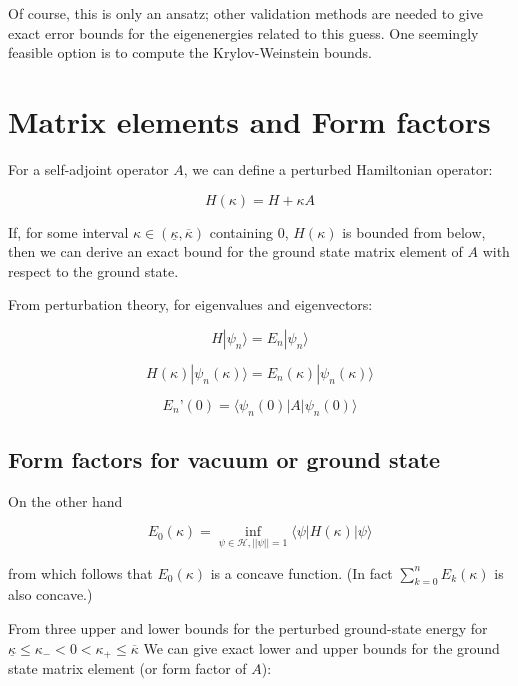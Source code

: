 \documentclass{article}
\theoremstyle{definition}
\begin{document}
Of course, this is only an ansatz; other validation methods are needed to give exact error bounds for the eigenenergies related to this guess. One seemingly feasible option is to compute the Krylov-Weinstein bounds.


\section{Matrix elements and Form factors}

For a self-adjoint operator $ A$, we can define a perturbed Hamiltonian operator:

\begin{equation}
H(\kappa) = H+\kappa A
\end{equation}

If, for some interval $\kappa \in (\underline{\kappa}, \overline{\kappa})$ containing $0$, $H(\kappa)$ is bounded from below, then we can derive an exact bound for the ground state matrix element of $A$ with respect to the ground state.

From perturbation theory, for eigenvalues and eigenvectors:

\begin{equation}
H |\psi_n\rangle = E_n |\psi_n\rangle
\end{equation}

\begin{equation}
H(\kappa) | \psi_n(\kappa) \rangle = E_n(\kappa) | \psi_n(\kappa) \rangle
\end{equation}

\begin{equation}
E_n’(0) = \langle \psi_n(0) | A | \psi_n(0) \rangle
\end{equation}

\subsection{Form factors for vacuum or ground state}

On the other hand

\begin{equation}
E_0(\kappa) = \inf_{\psi \in \mathcal{H}, ||\psi||=1} \langle \psi | H(\kappa) | \psi \rangle
\end{equation}

from which follows that $E_0(\kappa)$ is a concave function. (In fact $\sum_{k=0}^n E_k(\kappa)$ is also concave.)

From three upper and lower bounds for the perturbed ground-state energy for $\underline{\kappa} \le \kappa_- < 0 < \kappa_+ \le \overline{\kappa}$
We can give exact lower and upper bounds for the ground state matrix element (or form factor of $A$):
\end{document}
